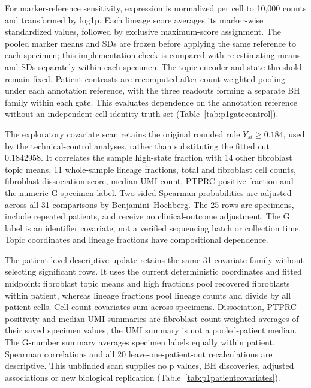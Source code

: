 \documentclass[10pt,a4paper]{article}
\begin{document}
For marker-reference sensitivity, expression is normalized per cell to 10,000 counts and transformed by log1p. Each lineage score averages its marker-wise standardized values, followed by exclusive maximum-score assignment. The pooled marker means and SDs are frozen before applying the same reference to each specimen; this implementation check is compared with re-estimating means and SDs separately within each specimen. The topic encoder and state threshold remain fixed. Patient contrasts are recomputed after count-weighted pooling under each annotation reference, with the three readouts forming a separate BH family within each gate. This evaluates dependence on the annotation reference without an independent cell-identity truth set (Table~\ref{tab:p1gatecontrol}).

The exploratory covariate scan retains the original rounded rule $Y_{si}\geq0.184$, used by the technical-control analyses, rather than substituting the fitted cut 0.1842958. It correlates the sample high-state fraction with 14 other fibroblast topic means, 11 whole-sample lineage fractions, total and fibroblast cell counts, fibroblast dissociation score, median UMI count, PTPRC-positive fraction and the numeric G specimen label. Two-sided Spearman probabilities are adjusted across all 31 comparisons by Benjamini--Hochberg. The 25 rows are specimens, include repeated patients, and receive no clinical-outcome adjustment. The G label is an identifier covariate, not a verified sequencing batch or collection time. Topic coordinates and lineage fractions have compositional dependence.

The patient-level descriptive update retains the same 31-covariate family without selecting significant rows. It uses the current deterministic coordinates and fitted midpoint: fibroblast topic means and high fractions pool recovered fibroblasts within patient, whereas lineage fractions pool lineage counts and divide by all patient cells. Cell-count covariates sum across specimens. Dissociation, PTPRC positivity and median-UMI summaries are fibroblast-count-weighted averages of their saved specimen values; the UMI summary is not a pooled-patient median. The G-number summary averages specimen labels equally within patient. Spearman correlations and all 20 leave-one-patient-out recalculations are descriptive. This unblinded scan supplies no p values, BH discoveries, adjusted associations or new biological replication (Table~\ref{tab:p1patientcovariates}).
\end{document}
